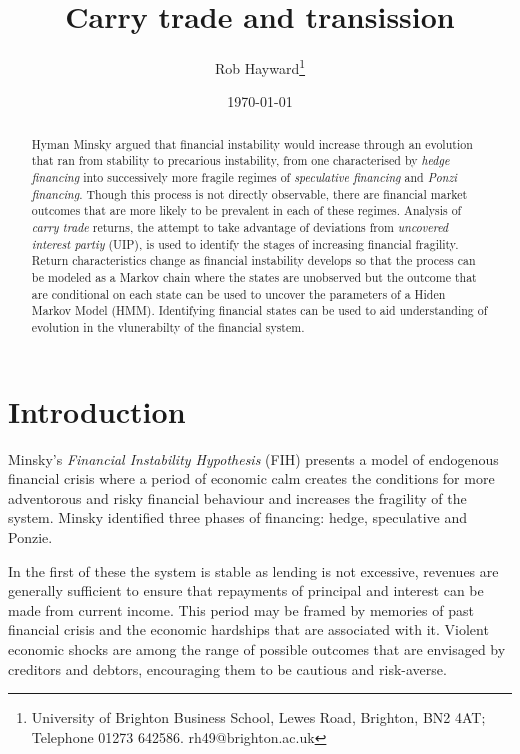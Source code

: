 \documentclass[12pt, a4paper, oneside]{article} %
\begin{document}
\title{Carry trade and transission}
\author{Rob Hayward\footnote{University of Brighton Business School, Lewes Road, Brighton, BN2 4AT; Telephone 01273 642586.  rh49@brighton.ac.uk}} 
\date{\today}
\maketitle
\begin{abstract}
Hyman Minsky argued that financial instability would increase through an evolution that ran from stability to precarious instability, from one characterised by \emph{hedge financing} into successively more fragile regimes of \emph{speculative financing} and \emph{Ponzi financing}.  Though this process is not directly observable, there are financial market outcomes that are more likely to be prevalent in each of these regimes.  Analysis of \emph{carry trade} returns, the attempt to take advantage of deviations from \emph{uncovered interest partiy} (UIP), is used to identify the stages of increasing financial fragility.  Return characteristics change as financial instability develops so that the process can be modeled as a Markov chain where the states are unobserved but the outcome that are conditional on each state can be used to uncover the parameters of a Hiden Markov Model (HMM).   Identifying financial states can be used to aid understanding of evolution in the vlunerabilty of the financial system.  %

\end{abstract}

\section{Introduction}
Minsky's \emph{Financial Instability Hypothesis} (FIH) presents a model of endogenous financial crisis where a period of economic calm creates the conditions for more adventorous and risky financial behaviour and increases the fragility of the system.  Minsky identified three phases of financing:  hedge, speculative and Ponzie.  

In the first of these the system is stable as lending is not excessive, revenues are generally sufficient to ensure that repayments of principal and interest can be made from current income.  This period may be framed by memories of past financial crisis and the economic hardships that are associated with it.  Violent economic shocks are among the range of possible outcomes that are envisaged by creditors and debtors, encouraging them to be cautious and risk-averse. 
\end{document}
